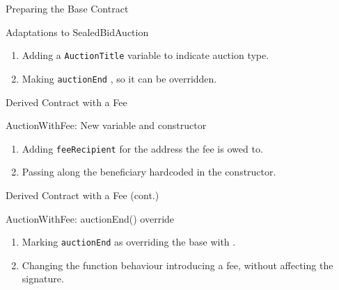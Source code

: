 \documentclass[]{beamer}
\begin{document}
\begin{frame}{Preparing the Base Contract}

\begin{samplecode}{Adaptations to SealedBidAuction}
	
\end{samplecode}
\begin{enumerate}
	\item	Adding a \texttt{AuctionTitle} variable to indicate auction type.
	\item	Making \texttt{auctionEnd} , so it can be overridden.
\end{enumerate}

\end{frame}

\begin{frame}{Derived Contract with a Fee}

\begin{samplecode}{AuctionWithFee: New variable and constructor}
	
\end{samplecode}
\begin{enumerate}
	\item	Adding \texttt{feeRecipient} for the address the fee is owed to.
	\item	Passing along the beneficiary hardcoded in the constructor.
\end{enumerate}

\end{frame}

\begin{frame}{Derived Contract with a Fee (cont.)}

\begin{samplecode}{AuctionWithFee: auctionEnd() override}
	
\end{samplecode}
\begin{enumerate}
	\item	Marking \texttt{auctionEnd} as overriding the base with .
	\item	Changing the function behaviour introducing a fee, without affecting the signature.
\end{enumerate}

\end{frame}
\end{document}
